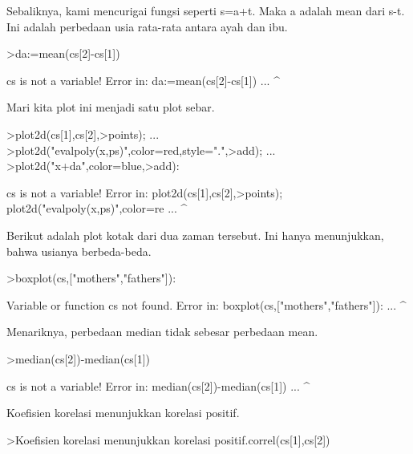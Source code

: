 \documentclass[a4paper,10pt]{article}
\begin{document}
\begin{eulernotebook}
\begin{eulercomment}
\begin{eulercomment}
\begin{eulercomment}
Sebaliknya, kami mencurigai fungsi seperti s=a+t. Maka a adalah mean
dari s-t. Ini adalah perbedaan usia rata-rata antara ayah dan ibu.
\end{eulercomment}
\begin{eulerprompt}
>da:=mean(cs[2]-cs[1])
\end{eulerprompt}
\begin{euleroutput}
  cs is not a variable!
  Error in:
  da:=mean(cs[2]-cs[1]) ...
                ^
\end{euleroutput}
\begin{eulercomment}
Mari kita plot ini menjadi satu plot sebar.
\end{eulercomment}
\begin{eulerprompt}
>plot2d(cs[1],cs[2],>points);  ...
>plot2d("evalpoly(x,ps)",color=red,style=".",>add);  ...
>plot2d("x+da",color=blue,>add):
\end{eulerprompt}
\begin{euleroutput}
  cs is not a variable!
  Error in:
  plot2d(cs[1],cs[2],>points);  plot2d("evalpoly(x,ps)",color=re ...
              ^
\end{euleroutput}
\begin{eulercomment}
Berikut adalah plot kotak dari dua zaman tersebut. Ini hanya
menunjukkan, bahwa usianya berbeda-beda.
\end{eulercomment}
\begin{eulerprompt}
>boxplot(cs,["mothers","fathers"]):
\end{eulerprompt}
\begin{euleroutput}
  Variable or function cs not found.
  Error in:
  boxplot(cs,["mothers","fathers"]): ...
            ^
\end{euleroutput}
\begin{eulercomment}
Menariknya, perbedaan median tidak sebesar perbedaan mean.
\end{eulercomment}
\begin{eulerprompt}
>median(cs[2])-median(cs[1])
\end{eulerprompt}
\begin{euleroutput}
  cs is not a variable!
  Error in:
  median(cs[2])-median(cs[1]) ...
              ^
\end{euleroutput}
\begin{eulercomment}
Koefisien korelasi menunjukkan korelasi positif.
\end{eulercomment}
\begin{eulerprompt}
>Koefisien korelasi menunjukkan korelasi positif.correl(cs[1],cs[2])

\end{eulerprompt}
\end{eulercomment}
\end{eulercomment}
\end{eulernotebook}
\end{document}
